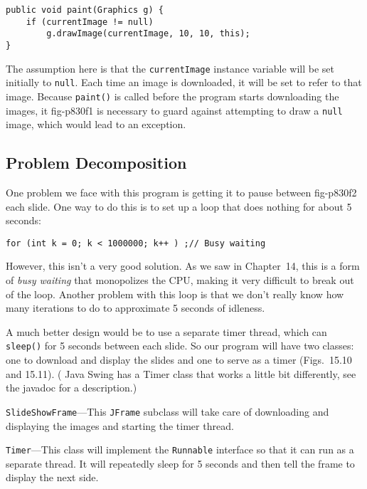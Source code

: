 \begin{jjjlisting}
\begin{lstlisting}
public void paint(Graphics g) {
    if (currentImage != null)
        g.drawImage(currentImage, 10, 10, this);
}
\end{lstlisting}
\end{jjjlisting}

\noindent The assumption here is that the {\tt currentImage} instance
variable will be set initially to {\tt null}. Each time an image is
downloaded, it will be set to refer to that image.   Because
{\tt paint()} is called before the program starts downloading the images, it
{fig-p830f1}
is necessary to guard against attempting to draw a {\tt null} image,
which would lead to an exception.

\subsection*{Problem Decomposition}
\noindent One problem we face with this program is getting it to pause between
 {fig-p830f2}
each slide.  One way to do this is to set up a loop that does nothing
for about 5 seconds:

\begin{jjjlisting}
\begin{lstlisting}
for (int k = 0; k < 1000000; k++ ) ;// Busy waiting
\end{lstlisting}
\end{jjjlisting}

\noindent However, this isn't a very good solution.  As we saw in
Chapter~14, this is a form of {\em busy waiting}
that monopolizes the CPU, making it very difficult to break out of the
loop.  Another problem with this loop is that we don't really know how many
iterations to do to approximate 5 seconds of idleness.

A much better design would be to use a separate timer thread, which
can {\tt sleep()} for 5 seconds between each slide. So our program
will have two classes: one to download and display the slides and one
to serve as a timer (Figs.~15.10 and 15.11). ( Java Swing has a
Timer class that works a little bit differently, see the javadoc for a description.)

\begin{BL}
\item  {\tt SlideShowFrame}---This {\tt JFrame}  subclass
will take care of downloading and displaying the images and starting
the timer thread.

\item  {\tt Timer}---This class will implement the
{\tt Runnable} interface so that it can run as a separate thread.  It will
repeatedly sleep for 5 seconds and then tell the frame to display the
next side.
\end{BL}


